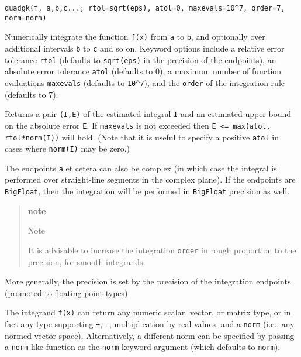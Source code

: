 \documentclass[11pt]{article}
\begin{document}
    \begin{verbatim}
quadgk(f, a,b,c...; rtol=sqrt(eps), atol=0, maxevals=10^7, order=7, norm=norm)
\end{verbatim}
Numerically integrate the function \texttt{f(x)} from \texttt{a} to \texttt{b}, and optionally over additional intervals \texttt{b} to \texttt{c} and so on. Keyword options include a relative error tolerance \texttt{rtol} (defaults to \texttt{sqrt(eps)} in the precision of the endpoints), an absolute error tolerance \texttt{atol} (defaults to 0), a maximum number of function evaluations \texttt{maxevals} (defaults to \texttt{10\^{}7}), and the \texttt{order} of the integration rule (defaults to 7).

Returns a pair \texttt{(I,E)} of the estimated integral \texttt{I} and an estimated upper bound on the absolute error \texttt{E}. If \texttt{maxevals} is not exceeded then \texttt{E <= max(atol, rtol*norm(I))} will hold. (Note that it is useful to specify a positive \texttt{atol} in cases where \texttt{norm(I)} may be zero.)

The endpoints \texttt{a} et cetera can also be complex (in which case the integral is performed over straight-line segments in the complex plane). If the endpoints are \texttt{BigFloat}, then the integration will be performed in \texttt{BigFloat} precision as well.

\begin{quote}
\textbf{note}

Note

It is advisable to increase the integration \texttt{order} in rough proportion to the precision, for smooth integrands.

\end{quote}
More generally, the precision is set by the precision of the integration endpoints (promoted to floating-point types).

The integrand \texttt{f(x)} can return any numeric scalar, vector, or matrix type, or in fact any type supporting \texttt{+}, \texttt{-}, multiplication by real values, and a \texttt{norm} (i.e., any normed vector space). Alternatively, a different norm can be specified by passing a \texttt{norm}-like function as the \texttt{norm} keyword argument (which defaults to \texttt{norm}).
\end{document}
